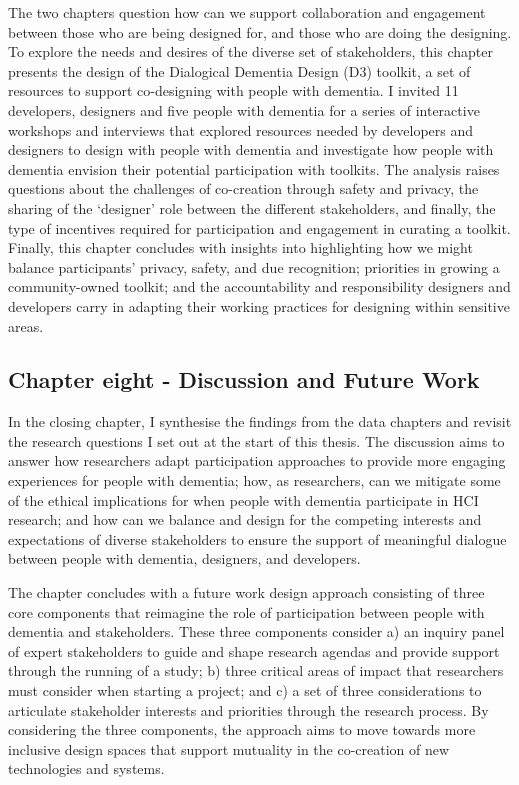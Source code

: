 The two chapters question how can we support collaboration and engagement between those who are being designed for, and those who are doing the designing. To explore the needs and desires of the diverse set of stakeholders, this chapter presents the design of the Dialogical Dementia Design (D3) toolkit, a set of resources to support co-designing with people with dementia. I invited 11 developers, designers and five people with dementia for a series of interactive workshops and interviews that explored resources needed by developers and designers to design with people with dementia and investigate how people with dementia envision their potential participation with toolkits. The analysis raises questions about the challenges of co-creation through safety and privacy, the sharing of the ‘designer’ role between the different stakeholders, and finally, the type of incentives required for participation and engagement in curating a toolkit. Finally, this chapter concludes with insights into highlighting how we might balance participants' privacy, safety, and due recognition; priorities in growing a community-owned toolkit; and the accountability and responsibility designers and developers carry in adapting their working practices for designing within sensitive areas.

\subsection{Chapter eight - Discussion and Future Work}
\label{Intro:ChapterEight}
In the closing chapter, I synthesise the findings from the data chapters and revisit the research questions I set out at the start of this thesis. The discussion aims to answer how researchers adapt participation approaches to provide more engaging experiences for people with dementia; how, as researchers, can we mitigate some of the ethical implications for when people with dementia participate in HCI research; and how can we balance and design for the competing interests and expectations of diverse stakeholders to ensure the support of meaningful dialogue between people with dementia, designers, and developers. 

The chapter concludes with a future work design approach consisting of three core components that reimagine the role of participation between people with dementia and stakeholders. These three components consider a) an inquiry panel of expert stakeholders to guide and shape research agendas and provide support through the running of a study; b) three critical areas of impact that researchers must consider when starting a project; and c) a set of three considerations to articulate stakeholder interests and priorities through the research process. By considering the three components, the approach aims to move towards more inclusive design spaces that support mutuality in the co-creation of new technologies and systems.

